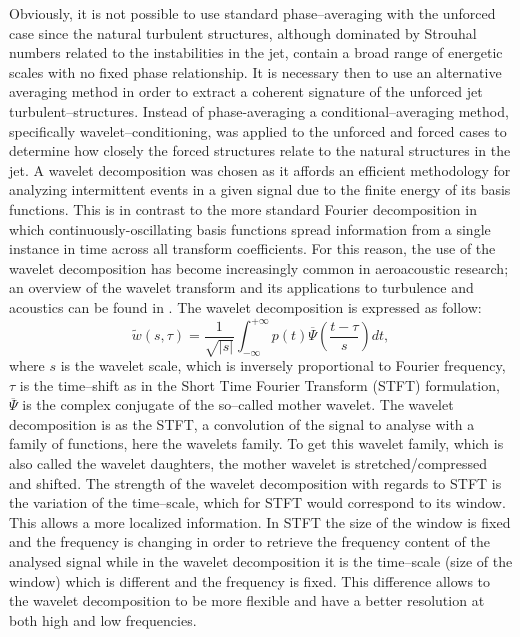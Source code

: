 Obviously, it is not possible to use standard phase--averaging with the unforced case since the natural turbulent structures, although dominated by Strouhal numbers related to the instabilities in the jet, contain a broad range of energetic scales with no fixed phase relationship. 
It is necessary then to use an alternative averaging method in order to extract a coherent signature of the unforced jet turbulent--structures.
Instead of phase-averaging a conditional--averaging method, specifically wavelet--conditioning, was applied to the unforced and forced cases to determine how closely the forced structures relate to the natural structures in the jet.
A wavelet decomposition was chosen as it affords an efficient methodology for analyzing intermittent events in a given signal due to the finite energy of its basis functions.
This is in contrast to the more standard Fourier decomposition in which continuously-oscillating basis functions spread information from a single instance in time across all transform coefficients.
For this reason, the use of the wavelet decomposition has become increasingly common in aeroacoustic research; an overview of the wavelet transform and its applications to turbulence and acoustics can be found in \citet{Farge1992}.
The wavelet decomposition is expressed as follow:
\begin{equation}\label{eqn:waveletDecomposition}
\tilde{w} \left( s, \tau \right) = \frac{1}{\sqrt{ \left| s \right|}} \int_{-\infty}^{+\infty} p \left( t \right) \overline{\Psi}\left( \frac{t - \tau}{s}\right) dt,
\end{equation}
where $s$ is the wavelet scale, which is inversely proportional to Fourier frequency, $\tau$ is the time--shift as in the Short Time Fourier Transform (STFT) formulation, $\overline{\Psi}$ is the complex conjugate of the so--called mother wavelet. The wavelet decomposition is as the STFT, a convolution of the signal to analyse with a family of functions, here the wavelets family. To get this wavelet family, which is also called the wavelet daughters, the mother wavelet is stretched/compressed and shifted. The strength of the wavelet decomposition with regards to STFT is the variation of the time--scale, which for STFT would correspond to its window. This allows a more localized information. In STFT the size of the window is fixed and the frequency is changing in order to retrieve the frequency content of the analysed signal while in the wavelet decomposition it is the time--scale (size of the window) which is different and the frequency is fixed. This difference allows to the wavelet decomposition to be more flexible and have a better resolution at both high and low frequencies.

